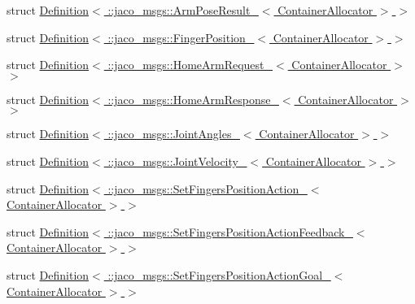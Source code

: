 \begin{DoxyCompactItemize}
\item 
struct \hyperlink{structros_1_1message__traits_1_1Definition_3_01_1_1jaco__msgs_1_1ArmPoseResult___3_01ContainerAllocator_01_4_01_4}{Definition$<$ \+::jaco\+\_\+msgs\+::\+Arm\+Pose\+Result\+\_\+$<$ Container\+Allocator $>$ $>$}
\item 
struct \hyperlink{structros_1_1message__traits_1_1Definition_3_01_1_1jaco__msgs_1_1FingerPosition___3_01ContainerAllocator_01_4_01_4}{Definition$<$ \+::jaco\+\_\+msgs\+::\+Finger\+Position\+\_\+$<$ Container\+Allocator $>$ $>$}
\item 
struct \hyperlink{structros_1_1message__traits_1_1Definition_3_01_1_1jaco__msgs_1_1HomeArmRequest___3_01ContainerAllocator_01_4_01_4}{Definition$<$ \+::jaco\+\_\+msgs\+::\+Home\+Arm\+Request\+\_\+$<$ Container\+Allocator $>$ $>$}
\item 
struct \hyperlink{structros_1_1message__traits_1_1Definition_3_01_1_1jaco__msgs_1_1HomeArmResponse___3_01ContainerAllocator_01_4_01_4}{Definition$<$ \+::jaco\+\_\+msgs\+::\+Home\+Arm\+Response\+\_\+$<$ Container\+Allocator $>$ $>$}
\item 
struct \hyperlink{structros_1_1message__traits_1_1Definition_3_01_1_1jaco__msgs_1_1JointAngles___3_01ContainerAllocator_01_4_01_4}{Definition$<$ \+::jaco\+\_\+msgs\+::\+Joint\+Angles\+\_\+$<$ Container\+Allocator $>$ $>$}
\item 
struct \hyperlink{structros_1_1message__traits_1_1Definition_3_01_1_1jaco__msgs_1_1JointVelocity___3_01ContainerAllocator_01_4_01_4}{Definition$<$ \+::jaco\+\_\+msgs\+::\+Joint\+Velocity\+\_\+$<$ Container\+Allocator $>$ $>$}
\item 
struct \hyperlink{structros_1_1message__traits_1_1Definition_3_01_1_1jaco__msgs_1_1SetFingersPositionAction___3_01ContainerAllocator_01_4_01_4}{Definition$<$ \+::jaco\+\_\+msgs\+::\+Set\+Fingers\+Position\+Action\+\_\+$<$ Container\+Allocator $>$ $>$}
\item 
struct \hyperlink{structros_1_1message__traits_1_1Definition_3_01_1_1jaco__msgs_1_1SetFingersPositionActionFeedbac5823ef9430ad3b0ad22085fd5f4ee086}{Definition$<$ \+::jaco\+\_\+msgs\+::\+Set\+Fingers\+Position\+Action\+Feedback\+\_\+$<$ Container\+Allocator $>$ $>$}
\item 
struct \hyperlink{structros_1_1message__traits_1_1Definition_3_01_1_1jaco__msgs_1_1SetFingersPositionActionGoal___5076b256990d9b08a420815c0a2c9b99}{Definition$<$ \+::jaco\+\_\+msgs\+::\+Set\+Fingers\+Position\+Action\+Goal\+\_\+$<$ Container\+Allocator $>$ $>$}
\item 

\end{DoxyCompactItemize}
